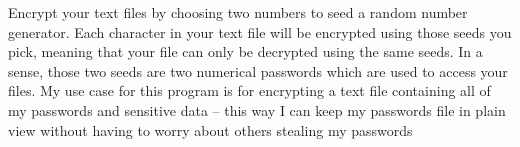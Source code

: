 Encrypt your text files by choosing two numbers to seed a random number generator. Each character in your text file will be encrypted using those seeds you pick, meaning that your file can only be decrypted using the same seeds. In a sense, those two seeds are two numerical passwords which are used to access your files. My use case for this program is for encrypting a text file containing all of my passwords and sensitive data -- this way I can keep my passwords file in plain view without having to worry about others stealing my passwords 